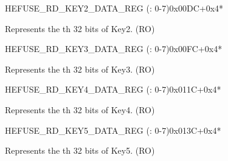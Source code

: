     \begin{register}{H}{EFUSE\_RD\_KEY2\_DATA\_REG (: 0-7)}{0x00DC+0x4*}\label{regdesc:EFUSERDKEY2DATANREG}
    \regnewline%
    \begin{regdesc}\begin{reglist}
    \label{fielddesc:EFUSEKEY2DATAN}\item [EFUSE\_KEY2\_DATA\regindex{n}] Represents the th 32 bits of Key2. (RO)
    \end{reglist}\end{regdesc}
    \end{register}


    \begin{register}{H}{EFUSE\_RD\_KEY3\_DATA\_REG (: 0-7)}{0x00FC+0x4*}\label{regdesc:EFUSERDKEY3DATANREG}
    \regnewline%
    \begin{regdesc}\begin{reglist}
    \label{fielddesc:EFUSEKEY3DATAN}\item [EFUSE\_KEY3\_DATA\regindex{n}] Represents the th 32 bits of Key3. (RO)
    \end{reglist}\end{regdesc}
    \end{register}


    \begin{register}{H}{EFUSE\_RD\_KEY4\_DATA\_REG (: 0-7)}{0x011C+0x4*}\label{regdesc:EFUSERDKEY4DATANREG}
    \regnewline%
    \begin{regdesc}\begin{reglist}
    \label{fielddesc:EFUSEKEY4DATAN}\item [EFUSE\_KEY4\_DATA\regindex{n}] Represents the th 32 bits of Key4. (RO)
    \end{reglist}\end{regdesc}
    \end{register}


    \begin{register}{H}{EFUSE\_RD\_KEY5\_DATA\_REG (: 0-7)}{0x013C+0x4*}\label{regdesc:EFUSERDKEY5DATANREG}
    \regnewline%
    \begin{regdesc}\begin{reglist}
    \label{fielddesc:EFUSEKEY5DATAN}\item [EFUSE\_KEY5\_DATA\regindex{n}] Represents the th 32 bits of Key5. (RO)
    \end{reglist}\end{regdesc}
    \end{register}


